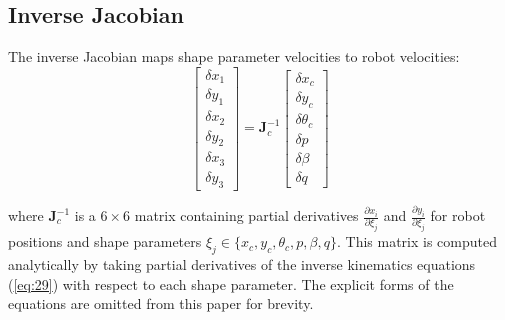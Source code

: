 \documentclass[lettersize,journal]{IEEEtran}
\begin{document}
\subsection{Inverse Jacobian}

The inverse Jacobian maps shape parameter velocities to robot velocities:
\begin{equation}\label{eq:30}
\begin{bmatrix}
\delta x_1 \\ \delta y_1 \\ \delta x_2 \\ \delta y_2 \\ \delta x_3 \\ \delta y_3
\end{bmatrix} =
\mathbf{J}_c^{-1}
\begin{bmatrix}
\delta x_c \\ \delta y_c \\ \delta \theta_c \\ \delta p \\ \delta \beta \\ \delta q
\end{bmatrix}
\end{equation}

where $\mathbf{J}_c^{-1}$ is a $6 \times 6$ matrix containing partial derivatives $\frac{\partial x_i}{\partial \xi_j}$ and $\frac{\partial y_i}{\partial \xi_j}$ for robot positions and shape parameters $\xi_j \in \{x_c, y_c, \theta_c, p, \beta, q\}$. This matrix is computed analytically by taking partial derivatives of the inverse kinematics equations (\ref{eq:29}) with respect to each shape parameter. The explicit forms of the equations are omitted from this paper for brevity.
\end{document}
